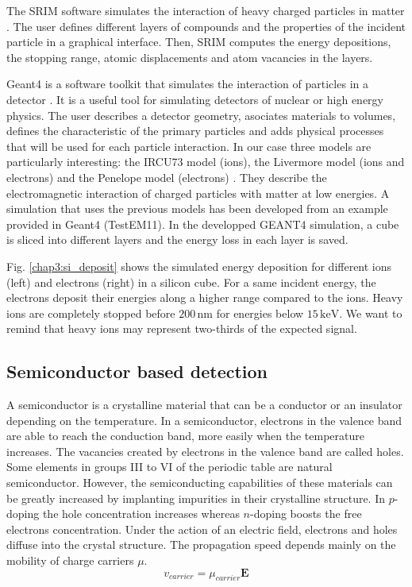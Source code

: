 \begin{refsection}
  The SRIM software simulates the interaction of heavy charged particles in matter \cite{srim2013}. The user defines different layers of compounds and the properties of the incident particle in a graphical interface. Then, SRIM computes the energy depositions, the stopping range, atomic displacements and atom vacancies in the layers.

  Geant4 is a software toolkit that simulates the interaction of particles in a detector \cite{Allison2006, Allison2016}. It is a useful tool for simulating detectors of nuclear or high energy physics. The user describes a detector geometry, asociates materials to volumes, defines the characteristic of the primary particles and adds physical processes that will be used for each particle interaction.
  In our case three models are particularly interesting: the IRCU73 model (ions), the Livermore model (ions and electrons) and the Penelope model (electrons) \cite{Bimbot73,livermore97, salvat2009}. They describe the electromagnetic interaction of charged particles with matter at low energies. A simulation that uses the previous models has been developed from an example provided in Geant4 (TestEM11). In the developped GEANT4 simulation, a cube is sliced into different layers and the energy loss in each layer is saved.

  

  Fig. \ref{chap3:si_deposit} shows the simulated energy deposition for different ions (left) and electrons (right) in a silicon cube. For a same incident energy, the electrons deposit their energies along a higher range compared to the ions. Heavy ions are completely stopped before $200\,\mathrm{nm}$ for energies below $15\,\mathrm{keV}$. We want to remind that heavy ions may represent two-thirds of the expected signal.

  \subsection{Semiconductor based detection}
  A semiconductor is a crystalline material that can be a conductor or an insulator depending on the temperature. In a semiconductor, electrons in the valence band are able to reach the conduction band, more easily when the temperature increases. The vacancies created by electrons in the valence band are called holes. Some elements in groups III to VI of the periodic table are natural semiconductor. However, the semiconducting capabilities of these materials can be greatly increased by implanting impurities in their crystalline structure. In $p$-doping the hole concentration increases whereas $n$-doping boosts the free electrons concentration. Under the action of an electric field, electrons and holes diffuse into the crystal structure. The propagation speed depends mainly on the mobility of charge carriers $\mu$.
  \begin{equation}
    v_{carrier} =  \mu_{carrier} \boldsymbol{E}
  \end{equation}


\end{refsection}
